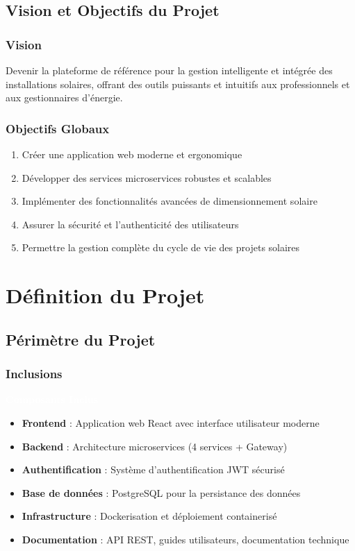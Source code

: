 \documentclass[12pt,a4paper,french]{report}
\newcommand{\boitetitre}[1]{
    \colorbox{SolarBlue}{\begin{minipage}{\textwidth}
    \textcolor{white}{\textbf{#1}}
    \end{minipage}}
}
\begin{document}
\section{Vision et Objectifs du Projet}

\subsection{Vision}

Devenir la plateforme de référence pour la gestion intelligente et intégrée des installations solaires, offrant des outils puissants et intuitifs aux professionnels et aux gestionnaires d'énergie.

\subsection{Objectifs Globaux}

\begin{enumerate}
    \item Créer une application web moderne et ergonomique
    \item Développer des services microservices robustes et scalables
    \item Implémenter des fonctionnalités avancées de dimensionnement solaire
    \item Assurer la sécurité et l'authenticité des utilisateurs
    \item Permettre la gestion complète du cycle de vie des projets solaires
\end{enumerate}

\chapter{Définition du Projet}

\section{Périmètre du Projet}

\subsection{Inclusions}

\boitetitre{Composants Inclus}

\begin{itemize}
    \item \textbf{Frontend} : Application web React avec interface utilisateur moderne
    \item \textbf{Backend} : Architecture microservices (4 services + Gateway)
    \item \textbf{Authentification} : Système d'authentification JWT sécurisé
    \item \textbf{Base de données} : PostgreSQL pour la persistance des données
    \item \textbf{Infrastructure} : Dockerisation et déploiement containerisé
    \item \textbf{Documentation} : API REST, guides utilisateurs, documentation technique
\end{itemize}
\end{document}
